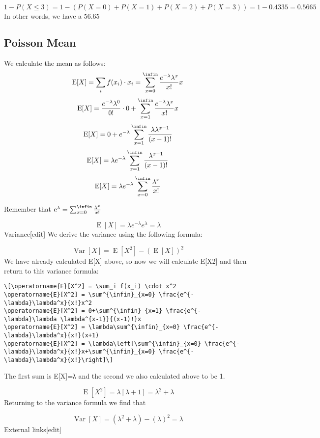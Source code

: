 \documentclass[a4paper,12pt]{article}
\begin{document}
\[1 - P(X\leq3) = 1 - ( P(X=0) + P(X=1) + P(X=2) + P(X=3) ) = 1 - 0.4335 = 0.5665\]
In other words, we have a 56.65%

\subsection*{Poisson Mean}
We calculate the mean as follows:
\[
\operatorname{E}[X] = \sum_i f(x_i) \cdot x_i = \sum^{\infin}_{x=0} \frac{e^{-\lambda}\lambda^x}{x!}x \]
\[
\operatorname{E}[X] = \frac{e^{-\lambda}\lambda^0}{0!}\cdot 0 + \sum^{\infin}_{x=1} \frac{e^{-\lambda}\lambda^x}{x!}x\]
\[
\operatorname{E}[X] = 0 + e^{-\lambda} \sum^{\infin}_{x=1} \frac{\lambda \lambda^{x-1}}{(x-1)!}\]
\[
\operatorname{E}[X] = \lambda e^{-\lambda}\sum^{\infin}_{x=1} \frac{\lambda^{x-1}}{(x-1)!}\]
\[
\operatorname{E}[X] = \lambda e^{-\lambda}\sum^{\infin}_{x=0} \frac{\lambda^x}{x!}\]

Remember that $\mathrm{e}^{\lambda} = \sum^{\infin}_{x=0} \frac{\lambda^x}{x!}$

$$\operatorname{E}[X] = \lambda e^{-\lambda}e^{\lambda}=\lambda$$
Variance[edit]
We derive the variance using the following formula:

\[\operatorname{Var}[X] = \operatorname{E}[X^2] - (\operatorname{E}[X])^2\]
We have already calculated E[X] above, so now we will calculate E[X2] and then return to this variance formula:
\begin{verbatim}
\[\operatorname{E}[X^2] = \sum_i f(x_i) \cdot x^2
\operatorname{E}[X^2] = \sum^{\infin}_{x=0} \frac{e^{-\lambda}\lambda^x}{x!}x^2
\operatorname{E}[X^2] = 0+\sum^{\infin}_{x=1} \frac{e^{-\lambda}\lambda \lambda^{x-1}}{(x-1)!}x
\operatorname{E}[X^2] = \lambda\sum^{\infin}_{x=0} \frac{e^{-\lambda}\lambda^x}{x!}(x+1)
\operatorname{E}[X^2] = \lambda\left[\sum^{\infin}_{x=0} \frac{e^{-\lambda}\lambda^x}{x!}x+\sum^{\infin}_{x=0} \frac{e^{-\lambda}\lambda^x}{x!}\right]\]
\end{verbatim}
The first sum is E[X]=λ and the second we also calculated above to be 1.

\[\operatorname{E}[X^2] = \lambda\left[\lambda+1\right]=\lambda^2+\lambda\]
Returning to the variance formula we find that

$$\operatorname{Var}[X] = (\lambda^2+\lambda) - (\lambda)^2=\lambda$$
External links[edit]
\end{document}
